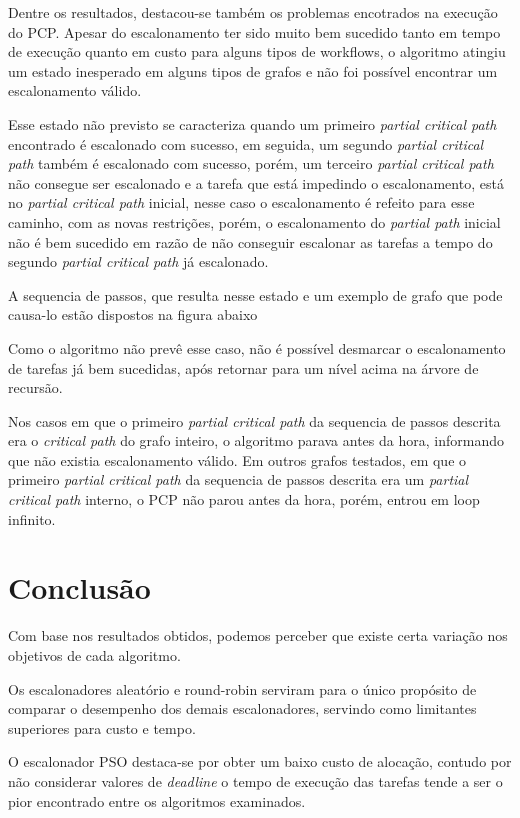 \documentclass[a4paper,10pt]{article}
\begin{document}
Dentre os resultados, destacou-se também os problemas encotrados na execução do PCP. Apesar do escalonamento ter sido muito bem sucedido tanto em tempo de execução quanto em custo para alguns tipos de workflows, o algoritmo atingiu um estado inesperado em alguns tipos de grafos e não foi possível encontrar um escalonamento válido.

Esse estado não previsto se caracteriza quando um primeiro \emph{partial critical path} encontrado é escalonado com sucesso, em seguida, um segundo \emph{partial critical path} também é escalonado com sucesso, porém, um terceiro \emph{partial critical path} não consegue ser escalonado e a tarefa que está impedindo o escalonamento, está no \emph{partial critical path} inicial, nesse caso o escalonamento é refeito para esse caminho, com as novas restrições, porém, o escalonamento do \emph{partial path} inicial não é bem sucedido em razão de não conseguir escalonar as tarefas a tempo do segundo \emph{partial critical path} já escalonado.

A sequencia de passos, que resulta nesse estado e um exemplo de grafo que pode causa-lo estão dispostos na figura abaixo

Como o algoritmo não prevê esse caso, não é possível desmarcar o escalonamento de tarefas já bem sucedidas, após retornar para um nível acima na árvore de recursão.

Nos casos em que o primeiro \emph{partial critical path} da sequencia de passos descrita era o \emph{critical path} do grafo inteiro, o algoritmo parava antes da hora, informando que não existia escalonamento válido.  Em outros grafos testados, em que o primeiro \emph{partial critical path} da sequencia de passos descrita era um \emph{partial critical path} interno, o PCP não parou antes da hora, porém, entrou em loop infinito.

\section{Conclusão}

Com base nos resultados obtidos, podemos perceber que existe certa variação nos
objetivos de cada algoritmo.

Os escalonadores aleatório e round-robin serviram para o único propósito de comparar
o desempenho dos demais escalonadores, servindo como limitantes superiores para custo
e tempo.

O escalonador PSO destaca-se por obter um baixo custo de alocação, contudo por não considerar
valores de \emph{deadline} o tempo de execução das tarefas tende a ser o pior encontrado
entre os algoritmos examinados.
\end{document}

